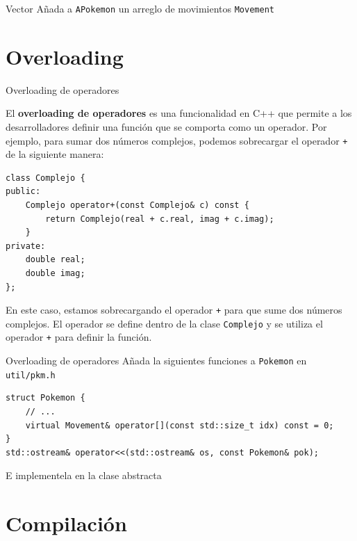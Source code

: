 \documentclass{beamer}
\begin{document}
\begin{frame}[fragile]{Vector}
Añada a \texttt{APokemon} un arreglo de movimientos \texttt{Movement}

\end{frame}
\section{Overloading}

\begin{frame}[fragile]{Overloading de operadores}

El \textbf{overloading de operadores} es una funcionalidad en C++ que permite a los desarrolladores definir una función que se comporta como un operador. Por ejemplo, para sumar dos números complejos, podemos sobrecargar el operador \texttt{+} de la siguiente manera:

\begin{verbatim}
class Complejo {
public:
    Complejo operator+(const Complejo& c) const {
        return Complejo(real + c.real, imag + c.imag);
    }
private:
    double real;
    double imag;
};
\end{verbatim}

En este caso, estamos sobrecargando el operador \texttt{+} para que sume dos números complejos. El operador se define dentro de la clase \texttt{Complejo} y se utiliza el operador \texttt{+} para definir la función.
\end{frame}
\begin{frame}[fragile]{Overloading de operadores}
Añada la siguientes funciones a \texttt{Pokemon} en \texttt{util/pkm.h}
\begin{verbatim}
struct Pokemon {
    // ...
    virtual Movement& operator[](const std::size_t idx) const = 0;
}
std::ostream& operator<<(std::ostream& os, const Pokemon& pok);
\end{verbatim}

E implementela en la clase abstracta
\end{frame}

\section{Compilación}
\end{document}
